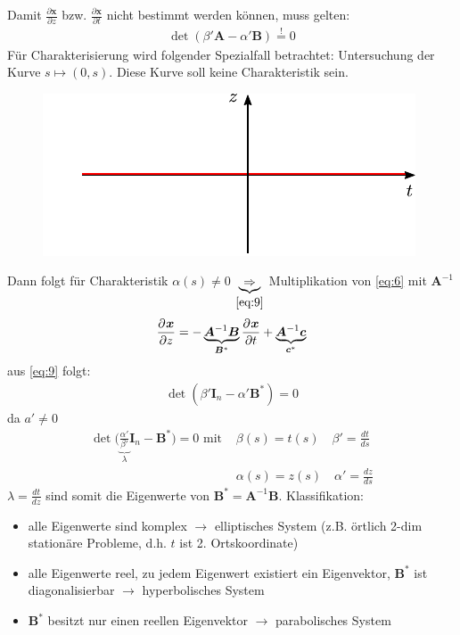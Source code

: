 Damit $\frac{\partial \bm{x}}{\partial z}$ bzw. $\frac{\partial \bm{x}}{\partial t}$ nicht bestimmt werden können, muss gelten:
\begin{align}
\label{eq:9}
\det(\beta'\bm{A}-\alpha'\bm{B}) \overset{!}{=} 0
\end{align}
Für Charakterisierung wird folgender Spezialfall betrachtet:
Untersuchung der Kurve $s \mapsto (0,s)$. Diese Kurve soll keine Charakteristik sein.

\begin{figure}[ht]
	\centering
	\includegraphics{img/keinecharakteristik}
	\label{fig:charakteristik}
\end{figure}

Dann folgt für Charakteristik $\alpha(s) \neq 0$
$\underbrace{\Rightarrow}_{\eqref{eq:9}} $
Multiplikation von \eqref{eq:6} mit $\bm{A}^{-1}$
\begin{align*}
\frac{\partial^{} \bm{x}}{\partial z}=-\underbrace{\bm{A}^{-1}\bm{B}}_{\bm{B}^*} \frac{\partial^{} \bm{x}}{\partial t}+\underbrace{\bm{A}^{-1}\bm{c}}_{\bm{c}^*}
\end{align*}
aus \eqref{eq:9} folgt: 
\begin{align*}
\det(\beta'\bm{I}_n-\alpha'\bm{B}^*)=0
\end{align*}
da $a'\neq0$
\begin{align*}
\det\Big(\underbrace{\frac{\alpha'}{\beta'}}_{\lambda}\bm{I}_n-\bm{B}^*\Big)=0 \textrm{ mit } &\beta(s) = t(s) \quad \beta'=\frac{dt}{ds} \\ &\alpha(s) = z(s) \quad \alpha'=\frac{dz}{ds}
\end{align*}
$\lambda = \frac{dt}{dz}$ sind somit die Eigenwerte von $\bm{B}^*=\bm{A}^{-1}\bm{B}$.
Klassifikation:
\begin{itemize}
\item alle Eigenwerte sind komplex $\rightarrow$ elliptisches System (z.B. örtlich 2-dim stationäre Probleme, d.h. $t$ ist 2. Ortskoordinate)
\item alle Eigenwerte reel, zu jedem Eigenwert existiert ein Eigenvektor, $\bm{B}^*$ ist diagonalisierbar $\rightarrow$ hyperbolisches System
\item $\bm{B}^*$  besitzt nur einen reellen Eigenvektor $\rightarrow$ parabolisches System
\end{itemize}

